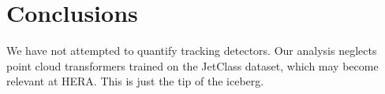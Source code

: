 \section{Conclusions}\label{sec:conclusions}

We have not attempted to quantify tracking detectors. Our analysis
neglects point cloud transformers trained on the JetClass dataset, which
may become relevant at HERA. This is just the tip of the iceberg.


